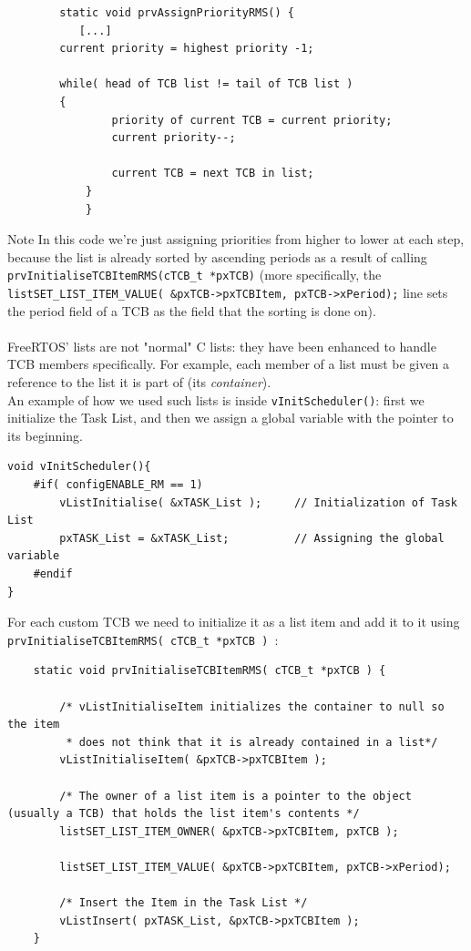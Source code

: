 \documentclass[10pt]{article}
\begin{document}
\begin{lstlisting}
        static void prvAssignPriorityRMS() {
           [...]
        current priority = highest priority -1;
        
		while( head of TCB list != tail of TCB list )
		{
                priority of current TCB = current priority;
                current priority--;

                current TCB = next TCB in list;
            }
            }
\end{lstlisting}
\begin{example}{Note}
In this code we're just assigning priorities from higher to lower at each step, because the list is already sorted by ascending periods as a result of calling \verb|prvInitialiseTCBItemRMS(cTCB_t *pxTCB)| (more specifically, the \verb|listSET_LIST_ITEM_VALUE( &pxTCB->pxTCBItem, pxTCB->xPeriod);| line sets the period field of a TCB as the field that the sorting is done on).\\\\ 
FreeRTOS' lists are not "normal" C lists: they have been enhanced to handle TCB members specifically. For example, each member of a list must be given a reference to the list it is part of (its \textit{container}). \\An example of how we used such lists is inside \verb|vInitScheduler()|: first we initialize the Task List, and then we assign a global variable with the pointer to its beginning.
\begin{lstlisting}
void vInitScheduler(){
    #if( configENABLE_RM == 1)
        vListInitialise( &xTASK_List );     // Initialization of Task List
        pxTASK_List = &xTASK_List;          // Assigning the global variable
    #endif
}
\end{lstlisting}
For each custom TCB we need to initialize it as a list item and add it to it using \verb|prvInitialiseTCBItemRMS( cTCB_t *pxTCB ) |:
\begin{lstlisting}
    static void prvInitialiseTCBItemRMS( cTCB_t *pxTCB ) {
    
        /* vListInitialiseItem initializes the container to null so the item
         * does not think that it is already contained in a list*/
        vListInitialiseItem( &pxTCB->pxTCBItem );
        
        /* The owner of a list item is a pointer to the object (usually a TCB) that holds the list item's contents */
        listSET_LIST_ITEM_OWNER( &pxTCB->pxTCBItem, pxTCB );
        
        listSET_LIST_ITEM_VALUE( &pxTCB->pxTCBItem, pxTCB->xPeriod);

        /* Insert the Item in the Task List */
        vListInsert( pxTASK_List, &pxTCB->pxTCBItem );
    }

\end{lstlisting}
\end{example}
\end{document}
